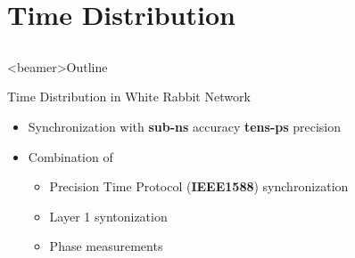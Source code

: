 \documentclass[compress,red]{beamer}
\begin{document}
\section{Time Distribution~~~}
\subsection{}
\begin{frame}<beamer>{Outline}
    \tableofcontents [currentsection]
\end{frame}
\begin{frame}{Time Distribution in White Rabbit Network}

  \begin{itemize}
    \item Synchronization with {\bf sub-ns} accuracy {\bf tens-ps} precision
    \item Combination of
	\begin{itemize}
	  \item Precision Time Protocol  ({\bf IEEE1588})  synchronization
	  \item Layer 1 syntonization
	  \item Phase measurements
	\end{itemize}
  \end{itemize}
\end{frame}
\end{document}
